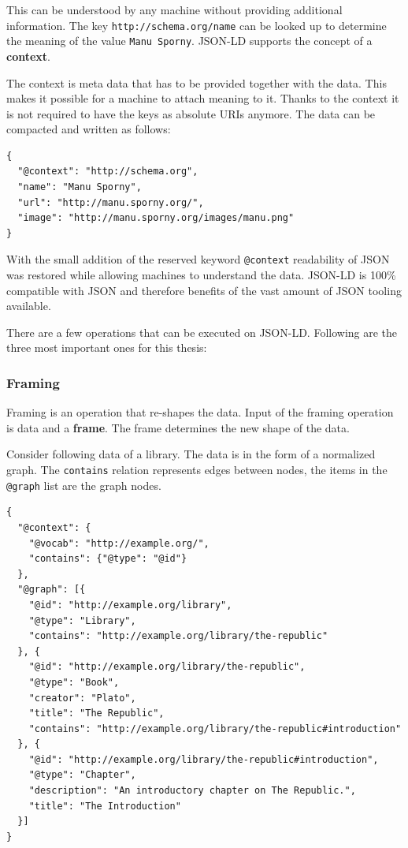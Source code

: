 This can be understood by any machine without providing additional information. The key \lstinline{http://schema.org/name} can be looked up to determine the meaning of the value \lstinline{Manu Sporny}. JSON-LD supports the concept of a \textbf{context}.

The context is meta data that has to be provided together with the data. This makes it possible for a machine to attach meaning to it. Thanks to the context it is not required to have the keys as absolute URIs anymore. The data can be compacted and written as follows:

\lstset{language=JSON}
\begin{lstlisting}[caption=Compacted data of a person, label=jsonldcompacted]
{
  "@context": "http://schema.org",
  "name": "Manu Sporny",
  "url": "http://manu.sporny.org/",
  "image": "http://manu.sporny.org/images/manu.png"
}
\end{lstlisting}

With the small addition of the reserved keyword \lstinline{@context} readability of JSON was restored while allowing machines to understand the data. JSON-LD is 100\% compatible with JSON and therefore benefits of the vast amount of JSON tooling available.

There are a few operations that can be executed on JSON-LD. Following are the three most important ones for this thesis:

\subsubsection{Framing}\label{jsonldframing}

Framing is an operation that re-shapes the data. Input of the framing operation is data and a \textbf{frame}. The frame determines the new shape of the data.

Consider following data of a library. The data is in the form of a normalized graph. The \lstinline{contains} relation represents edges between nodes, the items in the \lstinline{@graph} list are the graph nodes.

\lstset{language=JSON}
\begin{lstlisting}[caption=Data of a library as normalized graph]
{
  "@context": {
    "@vocab": "http://example.org/",
    "contains": {"@type": "@id"}
  },
  "@graph": [{
    "@id": "http://example.org/library",
    "@type": "Library",
    "contains": "http://example.org/library/the-republic"
  }, {
    "@id": "http://example.org/library/the-republic",
    "@type": "Book",
    "creator": "Plato",
    "title": "The Republic",
    "contains": "http://example.org/library/the-republic#introduction"
  }, {
    "@id": "http://example.org/library/the-republic#introduction",
    "@type": "Chapter",
    "description": "An introductory chapter on The Republic.",
    "title": "The Introduction"
  }]
}
\end{lstlisting}

